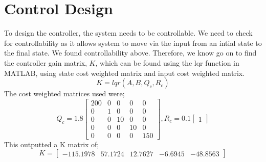 \documentclass[12pt]{article}
\begin{document}
\section{Control Design}
To design the controller, the system needs to be controllable. We need to check for controllability as it allows system to move via the input from an intial state to the final state. We found controllability above. Therefore, we know go on to find the controller gain matrix, $K$, which can be found using the lqr function in MATLAB, using state cost weighted matrix and input cost weighted matrix. \\
\begin{equation}
    K = lqr(A,B,Q_{c},R_{c})
\end{equation}
The cost weighted matrices used were;
\begin{equation*}
    Q_{c} = 1.8\begin{bmatrix}
    200 & 0 & 0 & 0 & 0\\
    0 & 1 & 0 & 0 & 0\\
    0 & 0 & 10 & 0 & 0\\
    0 & 0 & 0 & 10 & 0\\
    0 & 0 & 0 & 0 & 150
    \end{bmatrix} , R_{c} = 0.1\begin{bmatrix}
    1
    \end{bmatrix}
\end{equation*}
This outputted a K matrix of;
\begin{equation}
    K = \begin{bmatrix}
    -115.1978 & 57.1724 & 12.7627 & -6.6945 & -48.8563
    \end{bmatrix}
\end{equation}
\end{document}
